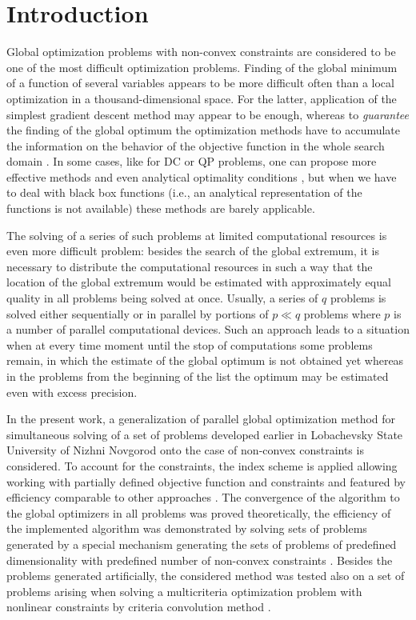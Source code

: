 \documentclass[runningheads]{llncs}
\begin{document}
\section{Introduction}
\label{sec-intro}
Global optimization problems with non-convex constraints are considered to be one
of the most difficult optimization problems.
Finding of the global minimum of a function of several variables appears to be more
difficult often than a local optimization in a thousand-dimensional space.
For the latter, application of the simplest gradient descent method may appear to be enough,
whereas to \textit{guarantee} the finding of the global optimum the optimization
methods have to accumulate the information on the behavior of the objective function in the
whole search domain \cite{Jones2009,Paulavicius2011,Evtushenko2013,Strongin2000}.
In some cases, like for DC or QP problems, one can propose more effective methods and even
analytical optimality conditions \cite{PhamDinh2014, qpBook}, but when we have to deal with black box functions
(i.e., an analytical representation of the functions is not available) these methods are barely applicable.

The solving of a series of such problems at limited computational resources is even more
difficult problem: besides the search of the global extremum, it is necessary to distribute the
computational resources in such a way that the location of the global extremum would be
estimated with approximately equal quality in all problems being solved at once.
Usually, a series of \(q\) problems is solved either sequentially or in parallel by portions of \(p\ll
q\) problems where \(p\) is a number of parallel computational devices.
Such an approach leads to a situation when at every time moment until the stop of computations
some problems remain, in which the estimate of the global optimum is not obtained yet whereas
in the problems from the beginning of the list the optimum may be estimated even with excess
precision.

In the present work, a generalization of parallel global optimization method for simultaneous
solving of a set of problems developed earlier in Lobachevsky State University of Nizhni Novgorod
\cite{BarkalovStrongin2018} onto the case of non-convex constraints is considered. To account
for the constraints, the index scheme \cite{Strongin2000,Pugliese} is applied allowing working with
partially defined objective function and constraints and featured by efficiency comparable to other
approaches \cite{BarkalovLebedev2017}. The convergence of the algorithm to the global
optimizers in all problems was proved theoretically, the efficiency of the implemented
algorithm was demonstrated by solving sets of problems generated by a special mechanism
generating the sets of problems of predefined dimensionality with predefined number of
non-convex constraints \cite{GergelBarkalov2019}.
Besides the problems generated artificially, the considered method was tested also on a set of
problems arising when solving a multicriteria optimization problem with nonlinear constraints by
criteria convolution method \cite{Ehrgott2005}.
\end{document}
